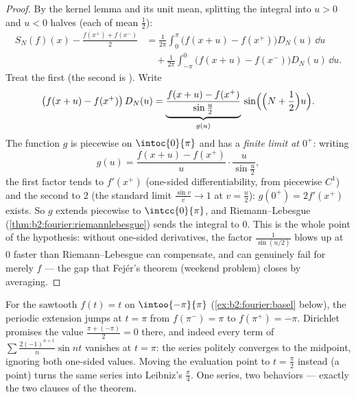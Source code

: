 \begin{proof}
By the kernel lemma and its unit mean, splitting the integral into
$u > 0$ and $u < 0$ halves (each of mean $\frac12$):
\begin{align*}
S_N(f)(x) - \frac{f(x^+) + f(x^-)}{2}
&= \frac{1}{2\pi}\int_{0}^{\pi} \bigl(f(x+u) -
f(x^+)\bigr)D_N(u)\,\dd u\\
&\quad+ \frac{1}{2\pi}\int_{-\pi}^{0}\bigl(f(x+u) -
f(x^-)\bigr)D_N(u)\,\dd u .
\end{align*}
Treat the first (the second is ). Write
\[
\bigl(f(x + u) - f(x^+)\bigr)\,D_N(u)
= \underbrace{\frac{f(x+u) - f(x^+)}{\sin\frac u2}}_{g(u)}\,
\sin\Bigl(\Bigl(N + \frac12\Bigr)u\Bigr) .
\]
The function $g$ is piecewise  on $\intoc{0}{\pi}$ and
has a \emph{finite limit at $0^+$}: writing
\[
g(u) = \frac{f(x+u) - f(x^+)}{u}\cdot\frac{u}{\sin\frac u2} ,
\]
the first factor tends to $f'(x^+)$ (one-sided
differentiability, from piecewise $C^1$) and the second to $2$
(the standard limit $\frac{\sin v}{v} \to 1$ at $v = \frac
u2$): $g(0^+) = 2f'(x^+)$ exists. So $g$ extends piecewise
 to $\intcc{0}{\pi}$, and Riemann--Lebesgue
(\cref{thm:b2:fourier:riemannlebesgue}) sends the integral to
$0$. This is the whole point of the hypothesis: without
one-sided derivatives, the factor $\frac{1}{\sin(u/2)}$ blows
up at $0$ faster than Riemann--Lebesgue can compensate, and
 can genuinely fail for merely 
$f$ --- the gap that Fej\'er's theorem (weekend problem)
closes by averaging.
\end{proof}

\begin{example}\label{ex:b2:fourier:jumpvalue}
For the sawtooth $f(t) = t$ on $\intoo{-\pi}{\pi}$
(\cref{ex:b2:fourier:basel} below), the periodic extension
jumps at $t = \pi$ from $f(\pi^-) = \pi$ to $f(\pi^+) = -\pi$.
Dirichlet promises the value $\frac{\pi + (-\pi)}{2} = 0$
there, and indeed every term of $\sum
\frac{2(-1)^{n+1}}{n}\sin nt$ vanishes at $t = \pi$: the
series politely converges to the midpoint, ignoring both
one-sided values. Moving the evaluation point to $t =
\frac\pi2$ instead (a  point) turns the same series
into Leibniz's $\frac\pi4$. One series, two behaviors ---
exactly the two clauses of the theorem.
\end{example}

